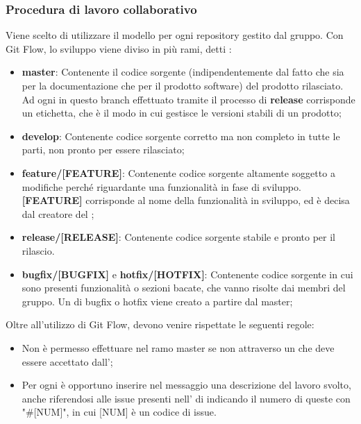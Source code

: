 \subsubsection{Procedura di lavoro collaborativo}
Viene scelto di utilizzare il modello  per ogni repository gestito dal gruppo.
Con Git Flow, lo sviluppo viene diviso in più rami, detti :
\begin{itemize}
	\item \textbf{master}: Contenente il codice sorgente (indipendentemente dal fatto che sia per la documentazione che per il prodotto software) del prodotto rilasciato.
	Ad ogni  in questo branch effettuato tramite il processo di \textbf{release} corrisponde un etichetta, che è il modo in cui  gestisce le versioni stabili di un prodotto;
	\item \textbf{develop}: Contenente codice sorgente corretto ma non completo in tutte le parti, non pronto per essere rilasciato;
	\item \textbf{feature/[FEATURE]}: Contenente codice sorgente altamente soggetto a modifiche perché riguardante una funzionalità in fase di sviluppo.
	\textbf{[FEATURE]} corrisponde al nome della funzionalità in sviluppo, ed è decisa dal creatore del ;
	\item \textbf{release/[RELEASE]}: Contenente codice sorgente stabile e pronto per il rilascio.
	\item \textbf{bugfix/[BUGFIX]} e \textbf{hotfix/[HOTFIX]}: Contenente codice sorgente in cui sono presenti funzionalità o sezioni bacate, che vanno risolte dai membri del gruppo.
	Un  di bugfix o hotfix viene creato a partire dal  master;
\end{itemize}

Oltre all'utilizzo di Git Flow, devono venire rispettate le seguenti regole:
\begin{itemize}
	\item Non è permesso effettuare  nel ramo master se non attraverso un  che deve essere accettato dall’\Amministratore{};
	\item Per ogni  è opportuno inserire nel messaggio una descrizione del lavoro svolto, anche riferendosi alle issue presenti nell' di  indicando il numero di queste con "\#[NUM]", in cui [NUM] è un codice di issue.
\end{itemize}
